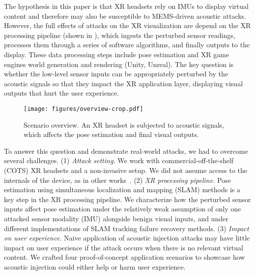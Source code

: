 The hypothesis in this paper is that XR headsets rely on IMUs to display virtual content and therefore may also be susceptible to MEMS-driven acoustic attacks.
However, the full effects of attacks on the XR visualization are depend on the XR processing pipeline (shown in ), which ingests the perturbed sensor readings, processes them through a series of software algorithms, and finally outputs to the display.
These data processing steps include pose estimation and XR game engines world generation and rendering (\eg Unity, Unreal).
The key question is whether the low-level sensor inputs can be  appropriately perturbed by the acoustic signals so that they impact the XR application layer, displaying visual outputs that hurt the user experience.

\begin{figure}
    \centering
    \texttt{[image: figures/overview-crop.pdf]} 
    \caption{Scenario overview. An XR headset is subjected to acoustic signals, which affects the pose estimation and final visual outputs.}
    \label{fig:overview}
\end{figure}

To answer this question and demonstrate real-world attacks, we had to overcome several challenges.
(1) \emph{Attack setting.}
We work with commercial-off-the-shelf (COTS) XR headsets and a non-invasive setup.
We did not assume access to the internals of the device, as in other works~\cite{trippel2017walnut}.
(2) \emph{XR processing pipeline.} 
Pose estimation using simultaneous localization and mapping (SLAM) methods is a key step in the XR processing pipeline. 
We characterize how the perturbed sensor inputs affect pose estimation under the relatively weak assumption of only one attacked sensor modality (IMU) alongside benign visual inputs, and under different implementations of SLAM tracking failure recovery methods.
(3) \emph{Impact on user experience.}
Naive application of acoustic injection attacks may have little impact on user experience if the attack occurs when there is no relevant virtual content.
We crafted four proof-of-concept application scenarios to showcase how acoustic injection could either help or harm user experience.

